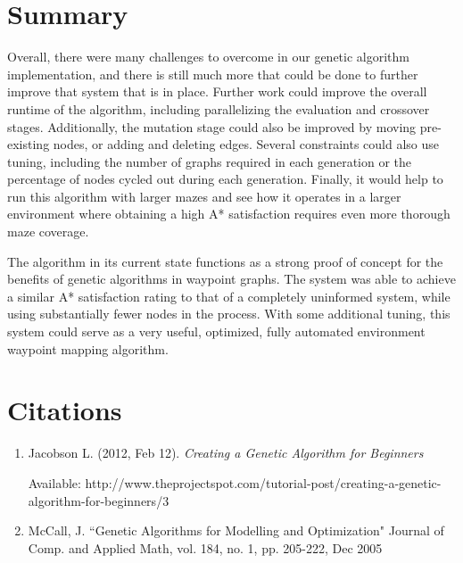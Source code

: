 \section{Summary}
	Overall, there were many challenges to overcome in our genetic algorithm implementation, and there is still much more that could be done to further improve that system that is in place. Further work could improve the overall runtime of the algorithm, including parallelizing the evaluation and crossover stages. Additionally, the mutation stage could also be improved by moving pre-existing nodes, or adding and deleting edges. Several constraints could also use tuning, including the number of graphs required in each generation or the percentage of nodes cycled out during each generation. Finally, it would help to run this algorithm with larger mazes and see how it operates in a larger environment where obtaining a high A* satisfaction requires even more thorough maze coverage.
	
	The algorithm in its current state functions as a strong proof of concept for the benefits of genetic algorithms in waypoint graphs. The system was able to achieve a similar A* satisfaction rating to that of a completely uninformed system, while using substantially fewer nodes in the process. With some additional tuning, this system could serve as a very useful, optimized, fully automated environment waypoint mapping algorithm.


\section{Citations}

\begin{enumerate}
	\item Jacobson L. (2012, Feb 12). \itshape{Creating a Genetic Algorithm for Beginners}
	
	Available: http://www.theprojectspot.com/tutorial-post/creating-a-genetic-algorithm-for-beginners/3 
	\item McCall, J. ``Genetic Algorithms for Modelling and Optimization" Journal of Comp. and Applied Math, vol. 184, no. 1, pp. 205-222, Dec 2005
\end{enumerate}